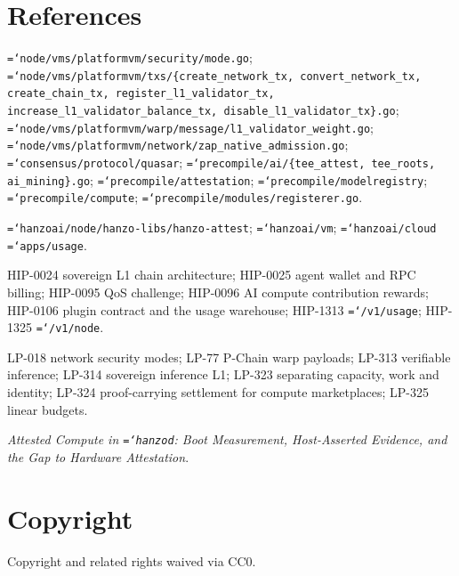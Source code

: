 \documentclass[11pt,a4paper]{article}
\newcommand{\code}[1]{\texttt{\hyphenchar\font=`\-\relax #1}}
\begin{document}
\section{References}

\begin{description}[leftmargin=0em,labelsep=0.6em]
  \item[Lux, implementation.]
    \code{node/vms/platformvm/security/mode.go};
    \code{node/vms/platformvm/txs/\{create\_network\_tx, convert\_network\_tx,
    create\_chain\_tx, register\_l1\_validator\_tx,
    increase\_l1\_validator\_balance\_tx, disable\_l1\_validator\_tx\}.go};
    \code{node/vms/platformvm/warp/message/l1\_validator\_weight.go};
    \code{node/vms/platformvm/network/zap\_native\_admission.go};
    \code{consensus/protocol/quasar};
    \code{precompile/ai/\{tee\_attest, tee\_roots, ai\_mining\}.go};
    \code{precompile/attestation};
    \code{precompile/modelregistry};
    \code{precompile/compute};
    \code{precompile/modules/registerer.go}.
  \item[Hanzo, implementation.]
    \code{hanzoai/node/hanzo-libs/hanzo-attest};
    \code{hanzoai/vm};
    \code{hanzoai/cloud} \code{apps/usage}.
  \item[Hanzo proposals.]
    HIP-0024 sovereign L1 chain architecture;
    HIP-0025 agent wallet and RPC billing;
    HIP-0095 QoS challenge;
    HIP-0096 AI compute contribution rewards;
    HIP-0106 plugin contract and the usage warehouse;
    HIP-1313 \code{/v1/usage};
    HIP-1325 \code{/v1/node}.
  \item[Lux proposals and papers.]
    LP-018 network security modes;
    LP-77 P-Chain warp payloads;
    LP-313 verifiable inference;
    LP-314 sovereign inference L1;
    LP-323 separating capacity, work and identity;
    LP-324 proof-carrying settlement for compute marketplaces;
    LP-325 linear budgets.
  \item[Hanzo papers.]
    \emph{Attested Compute in \code{hanzod}: Boot Measurement, Host-Asserted
    Evidence, and the Gap to Hardware Attestation}.
\end{description}

\section*{Copyright}

Copyright and related rights waived via CC0.
\end{document}
